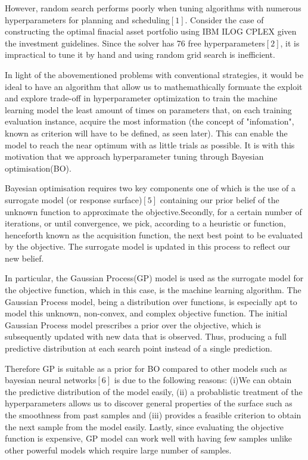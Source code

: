 \documentclass[letterpaper]{article}
\begin{document}
However, random search performs poorly when tuning algorithms with numerous hyperparameters for planning and scheduling$[1]$. Consider the case of constructing the optimal finacial asset portfolio using IBM ILOG CPLEX given the investment guidelines. Since the solver has 76 free hyperparameters$[2]$, it is impractical to tune it by hand and using random grid search is inefficient.

In light of the abovementioned problems with conventional strategies, it would be ideal
to have an algorithm that allow us to mathemathically formuate the exploit and explore
trade-off in hyperparameter optimization to train the machine learning model the least
amount of times on parameters that, on each training evaluation instance, acquire the
most information (the concept of "infomation", known as criterion will have to be defined,
as seen later). This can enable the model to reach the near optimum with as little trials as possible.
It is with this motivation that we approach hyperparameter tuning through Bayesian optimisation(BO).

Bayesian optimisation requires two key components one of which is the use of a surrogate model (or response surface)$[5]$ containing our prior belief of the unknown function to approximate the objective.Secondly, for a certain number of iterations, or until
convergence, we pick, according to a heuristic or function, henceforth known as the
acquisition function, the next best point to be evaluated by the objective. The
surrogate model is updated in this process to reflect our new belief. 

In particular, the Gaussian Process(GP) model is used as the surrogate model
for the objective function, which in this case, is the machine learning algorithm.
The Gaussian Process model, being a distribution over functions, is especially apt
to model this unknown, non-convex, and complex objective function. The
initial Gaussian Process model prescribes a prior over the objective, which is
subsequently updated with new data that is observed.
Thus, producing a full predictive distribution at each search point instead of a single prediction.
 
Therefore GP is suitable as a prior for BO compared to other models such as bayesian neural networks$[6]$ is due to the following reasons: (i)We can obtain the predictive distribution of the model easily, (ii) a probablistic treatment of the hyperparameters allows us to discover general properties of the surface such as the smoothness from past samples and (iii) provides a feasible criterion to obtain the next sample from the model easily. Lastly, since evaluating the objective function is expensive, GP model can work well with having few samples unlike other powerful models which require large number of samples.  
\end{document}
